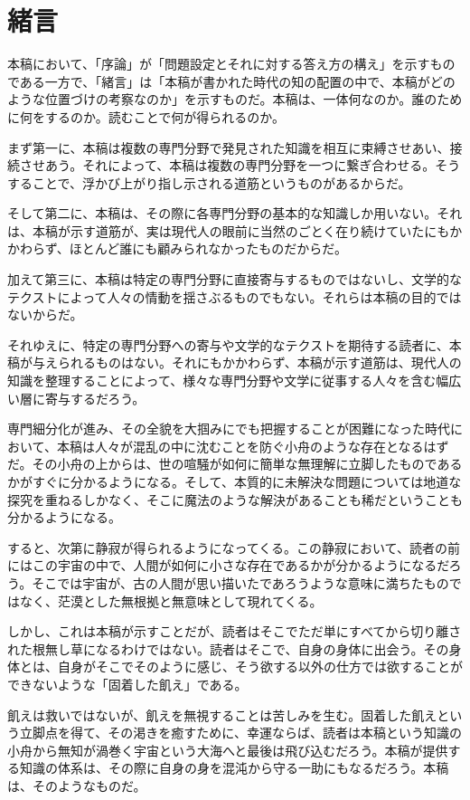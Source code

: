\section{緒言}\label{ux7dd2ux8a00}

本稿において、「序論」が「問題設定とそれに対する答え方の構え」を示すものである一方で、「緒言」は「本稿が書かれた時代の知の配置の中で、本稿がどのような位置づけの考察なのか」を示すものだ。本稿は、一体何なのか。誰のために何をするのか。読むことで何が得られるのか。

まず第一に、本稿は複数の専門分野で発見された知識を相互に束縛させあい、接続させあう。それによって、本稿は複数の専門分野を一つに繋ぎ合わせる。そうすることで、浮かび上がり指し示される道筋というものがあるからだ。

そして第二に、本稿は、その際に各専門分野の基本的な知識しか用いない。それは、本稿が示す道筋が、実は現代人の眼前に当然のごとく在り続けていたにもかかわらず、ほとんど誰にも顧みられなかったものだからだ。

加えて第三に、本稿は特定の専門分野に直接寄与するものではないし、文学的なテクストによって人々の情動を揺さぶるものでもない。それらは本稿の目的ではないからだ。

それゆえに、特定の専門分野への寄与や文学的なテクストを期待する読者に、本稿が与えられるものはない。それにもかかわらず、本稿が示す道筋は、現代人の知識を整理することによって、様々な専門分野や文学に従事する人々を含む幅広い層に寄与するだろう。

専門細分化が進み、その全貌を大掴みにでも把握することが困難になった時代において、本稿は人々が混乱の中に沈むことを防ぐ小舟のような存在となるはずだ。その小舟の上からは、世の喧騒が如何に簡単な無理解に立脚したものであるかがすぐに分かるようになる。そして、本質的に未解決な問題については地道な探究を重ねるしかなく、そこに魔法のような解決があることも稀だということも分かるようになる。

すると、次第に静寂が得られるようになってくる。この静寂において、読者の前にはこの宇宙の中で、人間が如何に小さな存在であるかが分かるようになるだろう。そこでは宇宙が、古の人間が思い描いたであろうような意味に満ちたものではなく、茫漠とした無根拠と無意味として現れてくる。

しかし、これは本稿が示すことだが、読者はそこでただ単にすべてから切り離された根無し草になるわけではない。読者はそこで、自身の身体に出会う。その身体とは、自身がそこでそのように感じ、そう欲する以外の仕方では欲することができないような「固着した飢え」である。

飢えは救いではないが、飢えを無視することは苦しみを生む。固着した飢えという立脚点を得て、その渇きを癒すために、幸運ならば、読者は本稿という知識の小舟から無知が渦巻く宇宙という大海へと最後は飛び込むだろう。本稿が提供する知識の体系は、その際に自身の身を混沌から守る一助にもなるだろう。本稿は、そのようなものだ。
